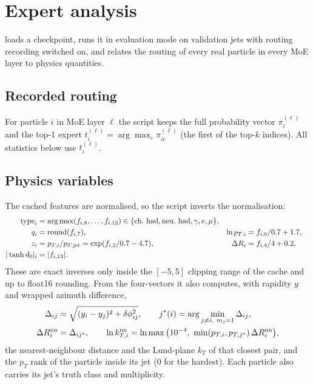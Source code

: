 \documentclass[11pt,a4paper]{article}
\newcommand{\code}[1]{\texttt{\detokenize{#1}}}
\begin{document}
\section{Expert analysis}

\code{analyze_experts.py} loads a checkpoint, runs it in evaluation mode on validation jets
with routing recording switched on, and relates the routing of every real particle in every
MoE layer to physics quantities.

\subsection{Recorded routing}
For particle $i$ in MoE layer $\ell$ the script keeps the full probability vector
$\pi^{(\ell)}_i$ and the top-1 expert $t^{(\ell)}_i=\arg\max_e\pi^{(\ell)}_{ie}$ (the first of
the top-$k$ indices). All statistics below use $t^{(\ell)}_i$.

\subsection{Physics variables}
The cached features are normalised, so the script inverts the normalisation:
\begin{align}
 \text{type}_i&=\arg\max(f_{i,8},\dots,f_{i,12})\in\{\text{ch.\ had},\text{neu.\ had},\gamma,e,\mu\},\\
 q_i&=\operatorname{round}(f_{i,7}),
 &\ln p_{T,i}&=f_{i,0}/0.7+1.7,\\
 z_i&=p_{T,i}/p_{T,\rm jet}=\exp(f_{i,2}/0.7-4.7),
 &\Delta R_i&=f_{i,4}/4+0.2,\\
 |\tanh d_0|_i&=|f_{i,13}|.
\end{align}
These are exact inverses only inside the $[-5,5]$ clipping range of the cache and up to
float16 rounding. From the four-vectors it also computes, with rapidity $y$ and wrapped
azimuth difference,
\begin{align}
 \Delta_{ij}&=\sqrt{(y_i-y_j)^2+\delta\phi_{ij}^2},\qquad
 j^\ast(i)=\arg\min_{j\ne i,\ m_j=1}\Delta_{ij},\\
 \Delta R^{\rm nn}_i&=\Delta_{i j^\ast},\qquad
 \ln k_{T,i}^{\rm nn}=\ln\max\big(10^{-4},\ \min(p_{T,i},p_{T,j^\ast})\,\Delta R^{\rm nn}_i\big),
\end{align}
the nearest-neighbour distance and the Lund-plane $k_T$ of that closest pair, and the
$p_T$ rank of the particle inside its jet (0 for the hardest). Each particle also carries
its jet's truth class and multiplicity.
\end{document}
